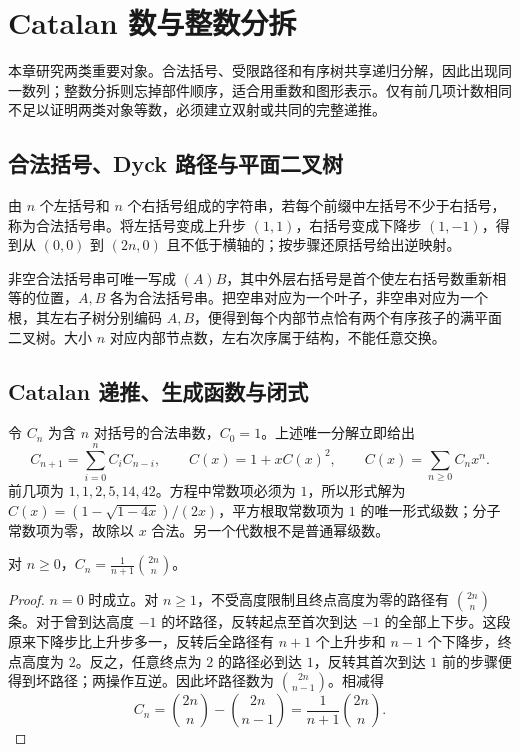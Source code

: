 \documentclass[UTF8,12pt,a4paper,fontset=fandol]{ctexbook}
\begin{document}
\chapter{Catalan 数与整数分拆}
\label{ch:classical-structures}

本章研究两类重要对象。合法括号、受限路径和有序树共享递归分解，因此出现同一数列；整数分拆则忘掉部件顺序，适合用重数和图形表示。仅有前几项计数相同不足以证明两类对象等数，必须建立双射或共同的完整递推。

\section{合法括号、Dyck 路径与平面二叉树}

由 $n$ 个左括号和 $n$ 个右括号组成的字符串，若每个前缀中左括号不少于右括号，称为合法括号串。将左括号变成上升步 $(1,1)$，右括号变成下降步 $(1,-1)$，得到从 $(0,0)$ 到 $(2n,0)$ 且不低于横轴的；按步骤还原括号给出逆映射。

非空合法括号串可唯一写成 $(A)B$，其中外层右括号是首个使左右括号数重新相等的位置，$A,B$ 各为合法括号串。把空串对应为一个叶子，非空串对应为一个根，其左右子树分别编码 $A,B$，便得到每个内部节点恰有两个有序孩子的满平面二叉树。大小 $n$ 对应内部节点数，左右次序属于结构，不能任意交换。

\section{Catalan 递推、生成函数与闭式}

令 $C_n$ 为含 $n$ 对括号的合法串数，$C_0=1$。上述唯一分解立即给出
\begin{equation}
 C_{n+1}=\sum_{i=0}^nC_iC_{n-i},\qquad
 C(x)=1+xC(x)^2,\qquad C(x)=\sum_{n\ge0}C_nx^n.
 \label{eq:catalan}
\end{equation}
前几项为 $1,1,2,5,14,42$。方程中常数项必须为 $1$，所以形式解为 $C(x)=(1-\sqrt{1-4x})/(2x)$，平方根取常数项为 $1$ 的唯一形式级数；分子常数项为零，故除以 $x$ 合法。另一个代数根不是普通幂级数。

\begin{theorem}[Catalan 公式]
对 $n\ge0$，$C_n=\frac1{n+1}\binom{2n}{n}$。
\end{theorem}
\begin{proof}
$n=0$ 时成立。对 $n\ge1$，不受高度限制且终点高度为零的路径有 $\binom{2n}{n}$ 条。对于曾到达高度 $-1$ 的坏路径，反转起点至首次到达 $-1$ 的全部上下步。这段原来下降步比上升步多一，反转后全路径有 $n+1$ 个上升步和 $n-1$ 个下降步，终点高度为 $2$。反之，任意终点为 $2$ 的路径必到达 $1$，反转其首次到达 $1$ 前的步骤便得到坏路径；两操作互逆。因此坏路径数为 $\binom{2n}{n-1}$。相减得
\[
 C_n=\binom{2n}{n}-\binom{2n}{n-1}
 =\frac1{n+1}\binom{2n}{n}.
\]
\end{proof}
\end{document}
